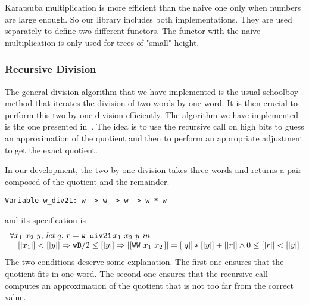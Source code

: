 Karatsuba multiplication is more efficient than the naive one
only when numbers are large enough. So our library
includes both implementations. They are used separately to define two
different functors. The functor with the naive multiplication is only used 
for trees of "small" height. 

\subsubsection{Recursive Division}
The general division algorithm that we have implemented is the usual schoolboy 
method that iterates the division of two words by one word. 
It is then crucial to perform this two-by-one division efficiently. 
The algorithm we have implemented is the one presented in~\cite{RecDiv}.
The idea is to use the recursive call on high bits to guess an approximation 
of the quotient and  then to perform an appropriate adjustment to get the exact quotient.

In our development, the two-by-one division takes
three words and returns a pair composed of the quotient and the remainder.
\begin{verbatim}
Variable w_div21: w -> w -> w -> w * w
\end{verbatim}
and its specification is 
$$\begin{array}{l}
\forall x_1\,\, x_2\,\, y,\, \textit{let}\,\, q,\, r = \texttt{w\_div21}\, x_1\,\, x_2\,\, y\,\, \textit{in}\,\, \\
\hskip10pt [|x_1|] < [|y|] \Rightarrow {\texttt{wB}} / 2 \le [|y|] \Rightarrow  [[\texttt{WW}\,\,x_1\,\,x_2\,]] = [|q|] * [|y|] + [|r|] \land 0 \le [|r|] < [|y|]
\end{array}
$$
The two conditions deserve some explanation.
The first one ensures that the quotient fits in one word.
The second one %
ensures that the recursive call computes an approximation 
of the quotient that is not too far from the correct value.

